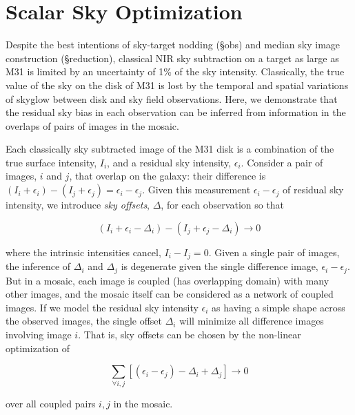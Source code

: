 \documentclass[iop]{emulateapj}
\begin{document}

\section{Scalar Sky Optimization}
\label{sec:scalar}

Despite the best intentions of sky-target nodding (\S obs) and median sky image construction (\S reduction), classical NIR sky subtraction on a target as large as M31 is limited by an uncertainty of 1\% of the sky intensity. Classically, the true value of the sky on the disk of M31 is lost by the temporal and spatial variations of skyglow between disk and sky field observations. Here, we demonstrate that the residual sky bias in each observation can be inferred from information in the overlaps of pairs of images in the mosaic.

Each classically sky subtracted image of the M31 disk is a combination of the true surface intensity, $I_i$, and a residual sky intensity, $\epsilon_i$. Consider a pair of images, $i$ and $j$, that overlap on the galaxy: their difference is $(I_i+\epsilon_i) - (I_j+\epsilon_j) = \epsilon_i - \epsilon_j$. Given this measurement $\epsilon_i - \epsilon_j$ of residual sky intensity, we introduce \emph{sky offsets}, $\Delta$, for each observation so that

\begin{equation}
    (I_i + \epsilon_i - \Delta_i) - (I_j + \epsilon_j - \Delta_i) \rightarrow 0
\end{equation}

\noindent where the intrinsic intensities cancel, $I_i - I_j = 0$. Given a single pair of images, the inference of $\Delta_i$ and $\Delta_j$ is degenerate given the single difference image, $\epsilon_i-\epsilon_j$. But in a mosaic, each image is coupled (has overlapping domain) with many other images, and the mosaic itself can be considered as a network of coupled images. If we model the residual sky intensity $\epsilon_i$ as having a simple shape across the observed images, the single offset $\Delta_i$ will minimize all difference images involving image $i$. That is, sky offsets can be chosen by the non-linear optimization of

\begin{equation}
    \sum_{\forall i,j} [(\epsilon_i - \epsilon_j) - \Delta_i + \Delta_j] \rightarrow 0
    \label{eq:scalartheoryobj}
\end{equation}

\noindent over all coupled pairs $i,j$ in the mosaic.
\end{document}
